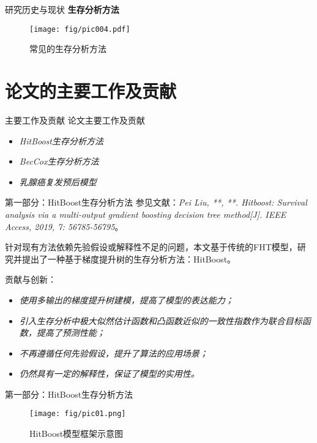 \documentclass[10pt]{beamer}
\begin{document}
\begin{frame}{研究历史与现状}
  \textbf{生存分析方法}

  \begin{figure}[H]
    \centering
    \texttt{[image: fig/pic004.pdf]}
    \caption{常见的生存分析方法}
  \end{figure}
\end{frame}

\section{论文的主要工作及贡献}

\begin{frame}{主要工作及贡献}
  论文主要工作及贡献
  \begin{itemize}
    \item \textit{HitBoost生存分析方法}
    \item \textit{BecCox生存分析方法}
    \item \textit{乳腺癌复发预后模型}
  \end{itemize}
\end{frame}

\begin{frame}{第一部分：HitBoost生存分析方法}
  参见文献：\textit{Pei Liu, **, **. Hitboost: Survival analysis via a multi­-output gradient boosting decision tree method[J]. IEEE Access, 2019, 7: 56785-­56795}。

  针对现有方法依赖先验假设或解释性不足的问题，本文基于传统的FHT模型，研究并提出了一种基于梯度提升树的生存分析方法：HitBoost。
  
  贡献与创新：
  \begin{itemize}
    \item \textit{使用多输出的梯度提升树建模，提高了模型的表达能力；}
    \item \textit{引入生存分析中极大似然估计函数和凸函数近似的一致性指数作为联合目标函数，提高了预测性能；}
    \item \textit{不再遵循任何先验假设，提升了算法的应用场景；}
    \item \textit{仍然具有一定的解释性，保证了模型的实用性。}
  \end{itemize}
  
\end{frame}

\begin{frame}{第一部分：HitBoost生存分析方法}
  \begin{figure}[H]
    \centering
    \texttt{[image: fig/pic01.png]}
    \caption{HitBoost模型框架示意图}
  \end{figure}
  
\end{frame}
\end{document}
